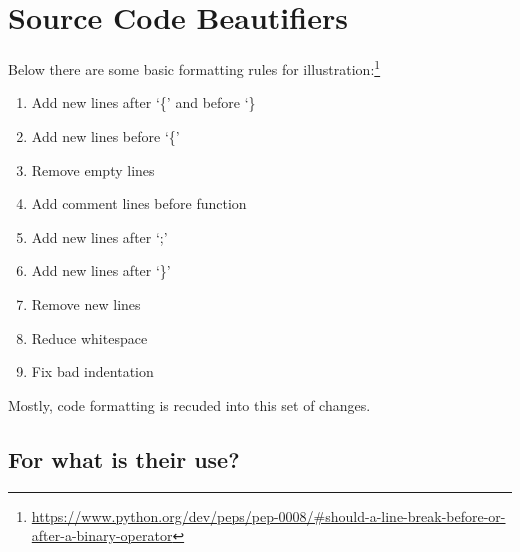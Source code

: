 

%


\chapter{Source Code Beautifiers}
\label{source_code_beautifiers}


    Below there are some basic formatting rules for
    illustration:\footnote{\url{https://www.python.org/dev/peps/pep-0008/#should-a-line-break-before-or-after-a-binary-operator}}

    \medskip
    \begin{enumerate}
        \item Add new lines after `\{' and before `\}
        \item Add new lines before `\{'
        \item Remove empty lines
        \item Add comment lines before function
        \item Add new lines after `;'
        \item Add new lines after `\}'
        \item Remove new lines
        \item Reduce whitespace
        \item Fix bad indentation
    \end{enumerate}
    \vspace{-4mm}\begin{flushright}\textcite{prettyPrinter}\end{flushright}

    Mostly,
    code formatting is recuded into this set of changes.



    \section{For what is their use?}

